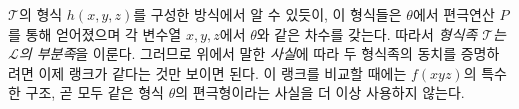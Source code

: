 
$\mathcal T$의 형식 $h(x,y,z)$를 구성한 방식에서 알 수 있듯이, 이 형식들은 $\theta$에서 편극연산 $P$를 통해 얻어졌으며 각 변수열 $x,y,z$에서 $\theta$와 같은 차수를 갖는다. 따라서 \emph{형식족 $\mathcal T$는 $\mathcal L$의 부분족}을 이룬다. 그러므로 위에서 말한 \emph{사실}에 따라 두 형식족의 동치를 증명하려면 이제 랭크가 같다는 것만 보이면 된다. 이 랭크를 비교할 때에는 $f(xyz)$의 특수한 구조, 곧 모두 같은 형식 $\theta$의 편극형이라는 사실을 더 이상 사용하지 않는다.
